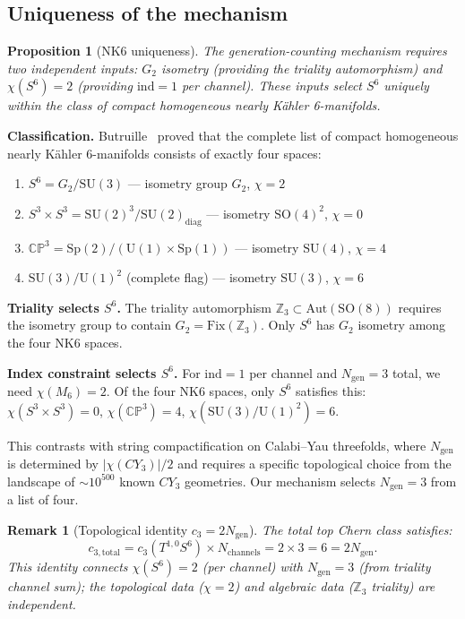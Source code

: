 \documentclass[12pt,a4paper]{article}
\newcommand{\ind}{\mathrm{ind}}
\newcommand{\ZZ}{\mathbb{Z}}
\newtheorem{proposition}[lemma]{Proposition}
\newtheorem{remark}[lemma]{Remark}
\begin{document}
\subsection{Uniqueness of the mechanism}
\label{sec:uniqueness}

\begin{proposition}[NK6 uniqueness]
The generation-counting mechanism requires two independent inputs: $G_2$ isometry
(providing the triality automorphism) and $\chi(S^6)=2$ (providing $\ind=1$ per channel).
These inputs select $S^6$ uniquely within the class of compact homogeneous nearly K\"ahler
6-manifolds.
\end{proposition}

\textbf{Classification.} Butruille~\cite{Butruille2005} proved that the complete list of
compact homogeneous nearly K\"ahler 6-manifolds consists of exactly four spaces:
\begin{enumerate}
  \item $S^6 = G_2/\mathrm{SU}(3)$ --- isometry group $G_2$, $\chi=2$
  \item $S^3\times S^3 = \mathrm{SU}(2)^3/\mathrm{SU}(2)_{\mathrm{diag}}$ --- isometry
        $\mathrm{SO}(4)^2$, $\chi=0$
  \item $\mathbb{CP}^3 = \mathrm{Sp}(2)/(\mathrm{U}(1)\times\mathrm{Sp}(1))$ --- isometry
        $\mathrm{SU}(4)$, $\chi=4$
  \item $\mathrm{SU}(3)/\mathrm{U}(1)^2$ (complete flag) --- isometry $\mathrm{SU}(3)$, $\chi=6$
\end{enumerate}

\textbf{Triality selects $S^6$.} The triality automorphism $\ZZ_3\subset\mathrm{Aut}(\mathrm{SO}(8))$
requires the isometry group to contain $G_2=\mathrm{Fix}(\ZZ_3)$. Only $S^6$ has $G_2$
isometry among the four NK6 spaces.

\textbf{Index constraint selects $S^6$.} For $\ind=1$ per channel and $N_{\mathrm{gen}}=3$
total, we need $\chi(M_6)=2$. Of the four NK6 spaces, only $S^6$ satisfies this:
$\chi(S^3\!\times\! S^3)=0$, $\chi(\mathbb{CP}^3)=4$, $\chi(\mathrm{SU}(3)/\mathrm{U}(1)^2)=6$.

This contrasts with string compactification on Calabi--Yau threefolds, where $N_{\mathrm{gen}}$
is determined by $|\chi(CY_3)|/2$ and requires a specific topological choice from the landscape
of $\sim\!10^{500}$ known $CY_3$ geometries. Our mechanism selects $N_{\mathrm{gen}}=3$ from
a list of four.

\begin{remark}[Topological identity $c_3 = 2N_{\mathrm{gen}}$]
The total top Chern class satisfies:
\begin{equation}
  c_{3,\mathrm{total}} = c_3(T^{1,0}S^6)\times N_{\mathrm{channels}} = 2\times 3 = 6 = 2N_{\mathrm{gen}}.
\end{equation}
This identity connects $\chi(S^6)=2$ (per channel) with $N_{\mathrm{gen}}=3$ (from triality
channel sum); the topological data ($\chi=2$) and algebraic data ($\ZZ_3$ triality) are
independent.
\end{remark}
\end{document}
